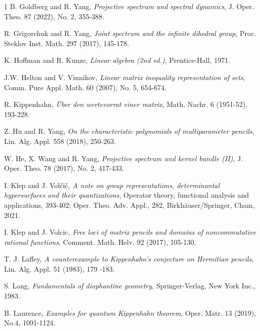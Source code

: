 \documentclass[draft, 12pt, reqno]{amsart}
\numberwithin{equation}{section}
\theoremstyle{plain}
\begin{document}
\begin{thebibliography}{1}
 B. Goldberg and R. Yang, {\em Projective spectrum and spectral dynamics}, J. Oper. Theo. 87 (2022), No. 2, 355-388.

 R. Grigorchuk and R. Yang, {\em Joint spectrum and the infinite dihedral group}, Proc. Steklov Inst. Math. 297 (2017), 145-178.

 K. Hoffman and R. Kunze, {\em Linear algebra (2nd ed.)}, Prentice-Hall, 1971.

 J.W. Helton and V. Vinnikov, {\em Linear matrix inequality representation of sets}, Comm. Pure Appl. Math. 60 (2007), No. 5, 654-674.

 R. Kippenhahn, {\em \"{U}ber den wertevorrat einer matrix}, Math. Nachr. 6 (1951-52), 193-228.



 Z. Hu and R. Yang, {\em On the characteristic polynomials of multiparameter pencils}, Lin. Alg. Appl. 558 (2018), 250-263.

 W. He, X. Wang and R. Yang, {\em Projective spectrum and kernel bundle (II)}, J. Oper. Theo. 78 (2017), No. 2, 417-433.


 I. Klep and J. Vol\v{c}i\v{c}, {\em A note on group representations, determinantal hypersurfaces and their quantizations}, Operator theory, functional analysis and applications, 393-402; Oper. Theo. Adv. Appl., 282, Birkh\"auser/Springer, Cham, 2021.

 I. Klep and J. Volcic, {\em Free loci of matrix pencils and domains of noncommutative rational functions}, Comment. Math. Helv. 92 (2017), 105-130.

 T. J. Laffey, {\em A counterexample to Kippenhahn's conjecture on Hermitian pencils}, Lin. Alg. Appl. 51 (1983), 179 -183.

 S. Lang, {\em Fundamentals of diophantine geometry}, Springer-Verlag, New York Inc., 1983.

 B. Laurence, {\em Examples for quantum Kippenhahn theorem}, Oper. Matr. 13 (2019), No.4, 1091-1124.


\end{thebibliography}
\end{document}
